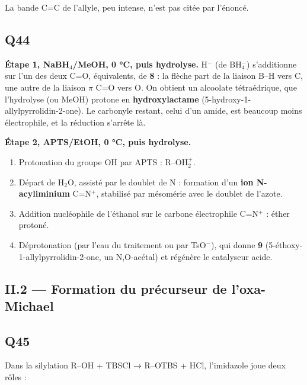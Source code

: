\documentclass[11pt,a4paper]{article}
\providecommand{\tightlist}{\setlength{\itemsep}{0pt}\setlength{\parskip}{0pt}}
\begin{document}
La bande C=C de l'allyle, peu intense, n'est pas citée par l'énoncé.

\hypertarget{q44}{%
\subsection{Q44}\label{q44}}

\textbf{Étape 1, NaBH\(_4\)/MeOH, 0 °C, puis hydrolyse.} H\(^-\) (de BH\(_4^-\)) s'additionne sur l'un des deux C=O, équivalents, de \textbf{8} : la flèche part de la liaison B--H vers C, une autre de la liaison \(\pi\) C=O vers O. On obtient un alcoolate tétraédrique, que l'hydrolyse (ou MeOH) protone en \textbf{hydroxylactame} (5-\allowbreak{}hydroxy-\allowbreak{}1-\allowbreak{}allylpyrrolidin-\allowbreak{}2-\allowbreak{}one). Le carbonyle restant, celui d'un amide, est beaucoup moins électrophile, et la réduction s'arrête là.

\textbf{Étape 2, APTS/EtOH, 0 °C, puis hydrolyse.}

\begin{enumerate}
\def\labelenumi{\arabic{enumi}.}
\tightlist
\item
  Protonation du groupe OH par APTS : R--OH\(_2^+\).
\item
  Départ de H\(_2\)O, assisté par le doublet de N : formation d'un \textbf{ion N-acyliminium} C=N\(^+\), stabilisé par mésomérie avec le doublet de l'azote.
\item
  Addition nucléophile de l'éthanol sur le carbone électrophile C=N\(^+\) : éther protoné.
\item
  Déprotonation (par l'eau du traitement ou par TsO\(^-\)), qui donne \textbf{9} (5-\allowbreak{}éthoxy-\allowbreak{}1-\allowbreak{}allylpyrrolidin-\allowbreak{}2-\allowbreak{}one, un N,O-acétal) et régénère le catalyseur acide.
\end{enumerate}

\hypertarget{ii.2-formation-du-pruxe9curseur-de-loxa-michael}{%
\subsection{II.2 --- Formation du précurseur de l'oxa-Michael}\label{ii.2-formation-du-pruxe9curseur-de-loxa-michael}}

\hypertarget{q45}{%
\subsection{Q45}\label{q45}}

Dans la silylation R--OH + TBSCl → R--OTBS + HCl, l'imidazole joue deux rôles :
\end{document}
